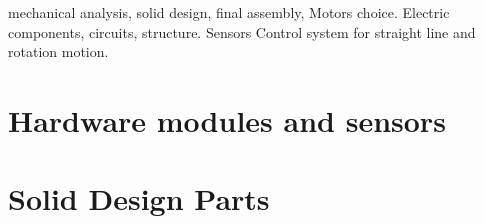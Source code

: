 \documentclass[12pt]{article}
\begin{document}
mechanical analysis, solid design, final assembly, Motors choice.
Electric components, circuits, structure.
Sensors
Control system for straight line and rotation motion.

\newpage
\appendix

\section{Hardware modules and sensors}

\section{Solid Design Parts}

\newpage
 


\end{document}
